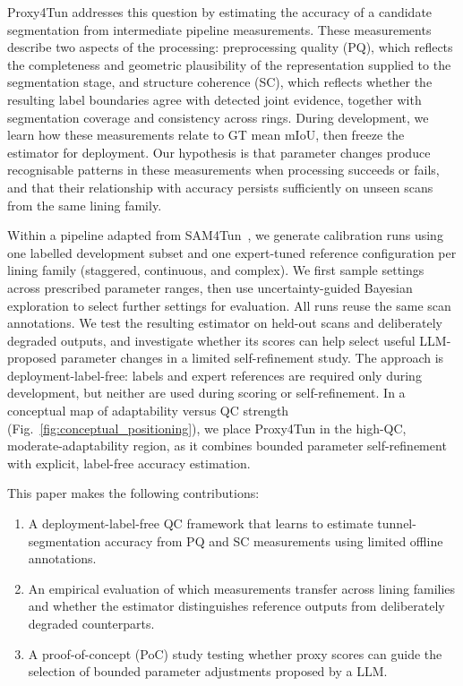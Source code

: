 \documentclass[a4paper,fleqn]{cas-dc}
\begin{document}
{Proxy4Tun addresses this question by estimating the accuracy of a candidate segmentation from intermediate pipeline measurements. These measurements describe two aspects of the processing: preprocessing quality (PQ), which reflects the completeness and geometric plausibility of the representation supplied to the segmentation stage, and structure coherence (SC), which reflects whether the resulting label boundaries agree with detected joint evidence, together with segmentation coverage and consistency across rings. During development, we learn how these measurements relate to GT mean mIoU, then freeze the estimator for deployment. Our hypothesis is that parameter changes produce recognisable patterns in these measurements when processing succeeds or fails, and that their relationship with accuracy persists sufficiently on unseen scans from the same lining family.

Within a pipeline adapted from SAM4Tun~\cite{ye2025sam4tun}, we generate calibration runs using one labelled development subset and one expert-tuned reference configuration per lining family (staggered, continuous, and complex). We first sample settings across prescribed parameter ranges, then use uncertainty-guided Bayesian exploration to select further settings for evaluation. All runs reuse the same scan annotations. We test the resulting estimator on held-out scans and deliberately degraded outputs, and investigate whether its scores can help select useful LLM-proposed parameter changes in a limited self-refinement study. The approach is deployment-label-free: labels and expert references are required only during development, but neither are used during scoring or self-refinement. 
In a conceptual map of adaptability versus QC strength (Fig.~\ref{fig:conceptual_positioning}), we place Proxy4Tun in the high-QC, moderate-adaptability region, as it combines bounded parameter self-refinement with explicit, label-free accuracy estimation. 

This paper makes the following contributions:
\begin{enumerate}
\item A deployment-label-free QC framework that learns to estimate tunnel-segmentation accuracy from PQ and SC measurements using limited offline annotations.
\item An empirical evaluation of which measurements transfer across lining families and whether the estimator distinguishes reference outputs from deliberately degraded counterparts.
\item A proof-of-concept (PoC) study testing whether proxy scores can guide the selection of bounded parameter adjustments proposed by a LLM.
\end{enumerate}

}
\end{document}
